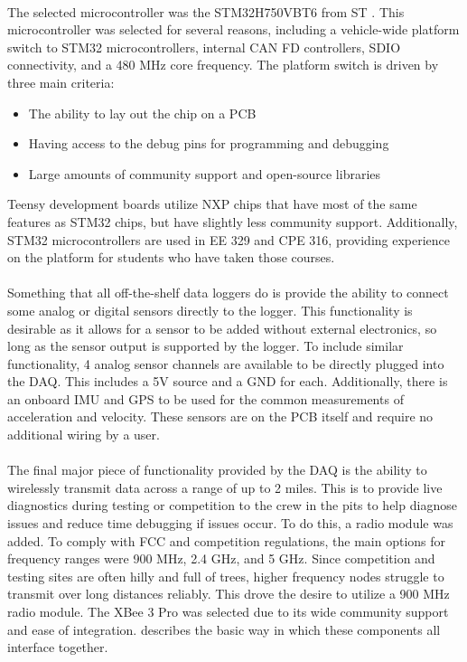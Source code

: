 \paragraph{}
The selected microcontroller was the STM32H750VBT6 from ST \cite{STMProductPage}.
This microcontroller was selected for several reasons, including a vehicle-wide platform switch to STM32 microcontrollers, internal CAN FD controllers, SDIO connectivity, and a 480 MHz core frequency.
The platform switch is driven by three main criteria:
\begin{itemize}
	\item The ability to lay out the chip on a PCB
	\item Having access to the debug pins for programming and debugging
	\item Large amounts of community support and open-source libraries
\end{itemize}
Teensy development boards utilize NXP chips that have most of the same features as STM32 chips, but have slightly less community support.
Additionally, STM32 microcontrollers are used in EE 329 and CPE 316, providing experience on the platform for students who have taken those courses.

\paragraph{}
Something that all off-the-shelf data loggers do is provide the ability to connect some analog or digital sensors directly to the logger.
This functionality is desirable as it allows for a sensor to be added without external electronics, so long as the sensor output is supported by the logger.
To include similar functionality, 4 analog sensor channels are available to be directly plugged into the DAQ.
This includes a 5V source and a GND for each.
Additionally, there is an onboard IMU and GPS to be used for the common measurements of acceleration and velocity.
These sensors are on the PCB itself and require no additional wiring by a user.

\paragraph{}
The final major piece of functionality provided by the DAQ is the ability to wirelessly transmit data across a range of up to 2 miles.
This is to provide live diagnostics during testing or competition to the crew in the pits to help diagnose issues and reduce time debugging if issues occur.
To do this, a radio module was added.
To comply with FCC and competition regulations, the main options for frequency ranges were 900 MHz, 2.4 GHz, and 5 GHz.
Since competition and testing sites are often hilly and full of trees, higher frequency nodes struggle to transmit over long distances reliably.
This drove the desire to utilize a 900 MHz radio module.
The XBee 3 Pro was selected due to its wide community support and ease of integration.
 describes the basic way in which these components all interface together.

